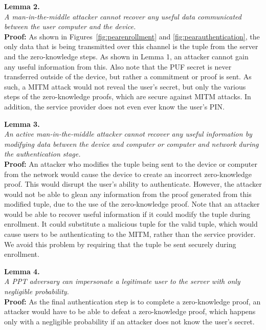 \noindent \textbf{Lemma 2.} \\
\noindent \emph{A man-in-the-middle attacker cannot recover any useful data communicated between the user computer and
the device.} \\
{\bf Proof:}  As shown in Figures~\ref{fig:pearenrollment} and \ref{fig:pearauthentication}, the only data that is being transmitted over this channel is
the tuple from the server and the zero-knowledge steps. As shown in Lemma 1, an attacker cannot gain any useful
information from this. 
Also note that the PUF secret is never transferred outside of the device, but rather a commitment or
proof is sent. As such, a MITM attack would not reveal the user's secret, but only the various steps of
the zero-knowledge proofs, which are secure against MITM attacks. In addition, the service provider does not even ever
know the user's PIN.%

\noindent \textbf{Lemma 3.} \\
\noindent \emph{An active man-in-the-middle attacker cannot recover any useful information by modifying data between
the device and computer or computer and network during the authentication stage.} \\
{\bf Proof:}  An attacker who modifies the tuple being sent to the device or computer from the network would cause the
device to create an incorrect zero-knowledge proof. This would disrupt the user's ability to authenticate. However,
the attacker would not be able to glean any information from the proof generated from this modified tuple, due to the
use of the zero-knowledge proof.
Note that an attacker would be able to recover useful information if it could modify the tuple during enrollment. It
could substitute a malicious tuple for the valid tuple, which would cause users to be authenticating to the MITM, rather
than the service provider. We avoid this problem by requiring that the tuple be sent securely during enrollment.

\noindent \textbf{Lemma 4.} \\
\noindent \emph{A PPT adversary can impersonate a legitimate user to the server with only negligible probability.} \\
{\bf Proof:}   As the final authentication step is to complete a zero-knowledge proof, an attacker would have to be able
to defeat a zero-knowledge proof, which happens only with a negligible probability if an attacker does not know the
user's secret.%

